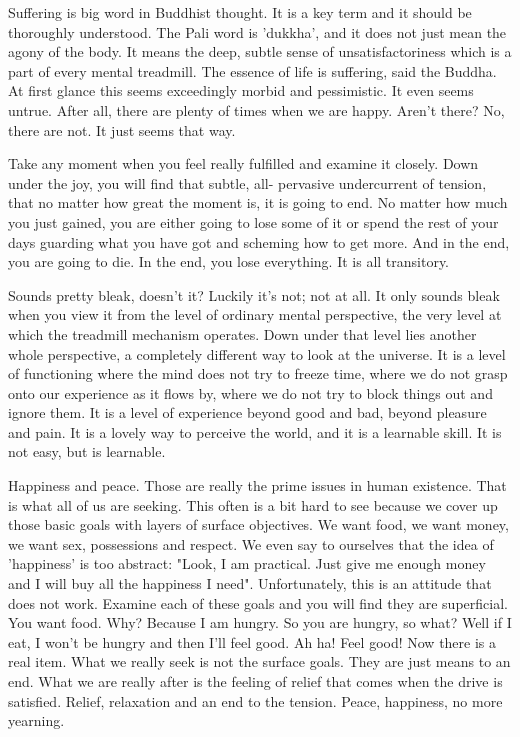 Suffering is big word in Buddhist thought. It is a key term and it should be
thoroughly understood. The Pali word is 'dukkha', and it does not just mean the
agony of the body. It means the deep, subtle sense of unsatisfactoriness which
is a part of every mental treadmill. The essence of life is suffering, said the
Buddha. At first glance this seems exceedingly morbid and pessimistic.  It even
seems untrue. After all, there are plenty of times when we are happy. Aren't
there? No, there are not. It just seems that way.

Take any moment when you feel really fulfilled and examine it closely. Down
under the joy, you will find that subtle, all- pervasive undercurrent of
tension, that no matter how great the moment is, it is going to end. No matter
how much you just gained, you are either going to lose some of it or spend the
rest of your days guarding what you have got and scheming how to get more. And
in the end, you are going to die. In the end, you lose everything. It is all
transitory.

Sounds pretty bleak, doesn't it? Luckily it's not; not at all. It only sounds
bleak when you view it from the level of ordinary mental perspective, the very
level at which the treadmill mechanism operates. Down under that level lies
another whole perspective, a completely different way to look at the universe.
It is a level of functioning where the mind does not try to freeze time, where
we do not grasp onto our experience as it flows by, where we do not try to block
things out and ignore them. It is a level of experience beyond good and bad,
beyond pleasure and pain. It is a lovely way to perceive the world, and it is a
learnable skill. It is not easy, but is learnable.

Happiness and peace. Those are really the prime issues in human existence. That
is what all of us are seeking. This often is a bit hard to see because we cover
up those basic goals with layers of surface objectives. We want food, we want
money, we want sex, possessions and respect. We even say to ourselves that the
idea of 'happiness' is too abstract: "Look, I am practical. Just give me enough
money and I will buy all the happiness I need". Unfortunately, this is an
attitude that does not work. Examine each of these goals and you will find they
are superficial. You want food. Why? Because I am hungry. So you are hungry, so
what? Well if I eat, I won't be hungry and then I'll feel good. Ah ha! Feel
good! Now there is a real item. What we really seek is not the surface goals.
They are just means to an end. What we are really after is the feeling of relief
that comes when the drive is satisfied.  Relief, relaxation and an end to the
tension. Peace, happiness, no more yearning.

